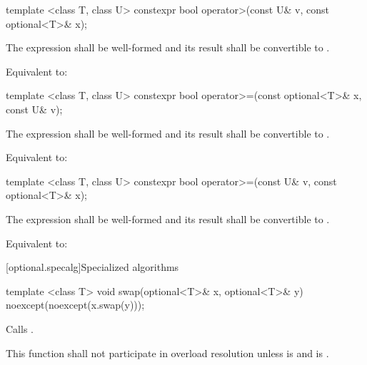 %
\begin{itemdecl}
template <class T, class U> constexpr bool operator>(const U& v, const optional<T>& x);
\end{itemdecl}

\begin{itemdescr}
\pnum
\requires
The expression  shall be well-formed and
its result shall be convertible to .

\pnum
\effects
Equivalent to: 
\end{itemdescr}

%
\begin{itemdecl}
template <class T, class U> constexpr bool operator>=(const optional<T>& x, const U& v);
\end{itemdecl}

\begin{itemdescr}
\pnum
\requires
The expression  shall be well-formed and
its result shall be convertible to .

\pnum
\effects
Equivalent to: 
\end{itemdescr}

%
\begin{itemdecl}
template <class T, class U> constexpr bool operator>=(const U& v, const optional<T>& x);
\end{itemdecl}

\begin{itemdescr}
\pnum
\requires
The expression  shall be well-formed and
its result shall be convertible to .

\pnum
\effects
Equivalent to: 
\end{itemdescr}


[optional.specalg]{Specialized algorithms}

%
\begin{itemdecl}
template <class T> void swap(optional<T>& x, optional<T>& y) noexcept(noexcept(x.swap(y)));
\end{itemdecl}

\begin{itemdescr}
\pnum
\effects
Calls .

\pnum
\remarks This function shall not participate in overload resolution
unless  is  and
 is .
\end{itemdescr}

